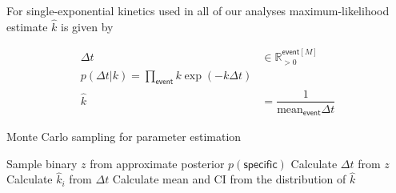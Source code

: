 For single-exponential kinetics used in all of our analyses maximum-likelihood estimate $\hat{k}$ is given by

\begin{subequations}
\begin{align}
    \Delta t &\in \mathbb{R}_{>0}^{\mathsf{event}[M]} \\
    p(\Delta t | k) = \prod_\mathsf{event} k \exp (- k \Delta t) \\
    \hat{k} &= \dfrac{1}{\mathrm{mean}_{\mathsf{event}} \Delta t}
\end{align}
\end{subequations}

\begin{algorithm}
\caption{Monte Carlo sampling for parameter estimation}
\begin{algorithmic}[1]
    \State Sample binary $z$ from approximate posterior $p(\mathsf{specific})$
    \State Calculate $\Delta t$ from $z$
    \State Calculate $\hat{k}_i$ from $\Delta t$
\EndFor{}
\State Calculate mean and CI from the distribution of $\hat{k}$
\end{algorithmic}
\end{algorithm}



